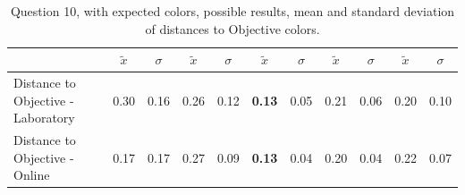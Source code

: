 \begin{table}[htbp]
{\begin{tabular}{lccccccccccccc}
                                                      & \multicolumn{1}{l}{}                 & \multicolumn{1}{l}{}     & \multicolumn{1}{l}{}       & \multicolumn{1}{c}{$\tilde{x}$} & \multicolumn{1}{c}{$\sigma$} & \multicolumn{1}{c}{$\tilde{x}$} & \multicolumn{1}{c}{$\sigma$} & \multicolumn{1}{c}{$\tilde{x}$} & \multicolumn{1}{c}{$\sigma$} & \multicolumn{1}{c}{$\tilde{x}$} & \multicolumn{1}{c}{$\sigma$} & \multicolumn{1}{c}{$\tilde{x}$} & \multicolumn{1}{c}{$\sigma$} \\ \hline
    \multicolumn{4}{l}{Distance to Objective - Laboratory}                                                                                           & \multicolumn{1}{|c}{0.30}       & \multicolumn{1}{c|}{0.16}    & \multicolumn{1}{|c}{0.26}       & \multicolumn{1}{c|}{0.12}    & \multicolumn{1}{|c}{\textbf{0.13}}       & \multicolumn{1}{c|}{0.05}    & \multicolumn{1}{|c}{0.21}       & \multicolumn{1}{c|}{0.06}    & \multicolumn{1}{|c}{0.20}       & \multicolumn{1}{c|}{0.10}    \\
    \multicolumn{4}{l}{Distance to Objective - Online}                                                                                               & \multicolumn{1}{|c}{0.17}        & \multicolumn{1}{c|}{0.17}    & \multicolumn{1}{|c}{0.27}        & \multicolumn{1}{c|}{0.09}    & \multicolumn{1}{|c}{\textbf{0.13}}       & \multicolumn{1}{c|}{0.04}    & \multicolumn{1}{|c}{0.20}        & \multicolumn{1}{c|}{0.04}    & \multicolumn{1}{|c}{0.22}       & \multicolumn{1}{c|}{0.07}    \\ \hline
    \end{tabular}}
  \caption[Question 10, with expected Results.]{Question 10, with expected colors, possible results, mean and standard deviation of distances to Objective colors.}
  \label{table:lab_q10_expected}
\end{table}
%
